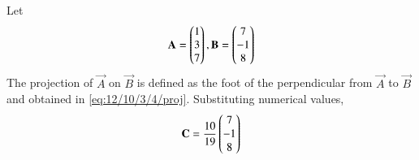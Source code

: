 		Let 
\begin{align}
 \mathbf{A} =\begin{pmatrix}1\\3\\7\end{pmatrix}, \mathbf{B} =\begin{pmatrix}7\\-1\\8\end{pmatrix}
\end{align}
The projection of $\vec{A}$ on $\vec{B}$ is defined as
the foot of the perpendicular from 
$\vec{A}$ to $\vec{B}$ and obtained in 
	\eqref{eq:12/10/3/4/proj}.
Substituting numerical values,
\begin{align}
	\mathbf{C}
		=\frac{10}{19}\begin{pmatrix}7\\-1\\8\end{pmatrix}
 \end{align}
